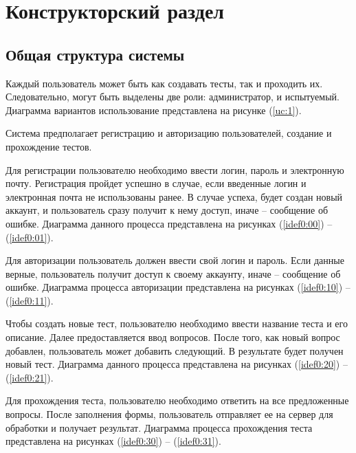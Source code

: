 \chapter{Конструкторский раздел}

\section{Общая структура системы}
Каждый пользователь может быть как создавать тесты, так и проходить их. Следовательно, могут быть выделены две роли: администратор, и испытуемый. Диаграмма вариантов использование представлена на рисунке (\ref{uc:1}).

Система предполагает регистрацию и авторизацию пользователей, создание и прохождение тестов. 
	
Для регистрации пользователю необходимо ввести логин, пароль и электронную почту. Регистрация пройдет успешно в случае, если введенные логин и электронная почта не использованы ранее. В случае успеха, будет создан новый аккаунт, и пользователь сразу получит к нему доступ, иначе -- сообщение об ошибке. Диаграмма данного процесса представлена на рисунках (\ref{idef0:00}) -- (\ref{idef0:01}).

Для авторизации пользователь должен ввести свой логин и пароль. Если данные верные, пользователь получит доступ к своему аккаунту, иначе -- сообщение об ошибке. Диаграмма процесса авторизации представлена на рисунках (\ref{idef0:10}) -- (\ref{idef0:11}).

Чтобы создать новые тест, пользователю необходимо ввести название теста и его описание. Далее предоставляется ввод вопросов. После того, как новый вопрос добавлен, пользователь может добавить следующий. В результате будет получен новый тест. Диаграмма данного процесса представлена на рисунках  (\ref{idef0:20}) -- (\ref{idef0:21}).

Для прохождения теста, пользователю необходимо ответить на все предложенные вопросы. После заполнения формы, пользователь отправляет ее на сервер для обработки и получает результат. Диаграмма процесса прохождения теста представлена на рисунках  (\ref{idef0:30}) -- (\ref{idef0:31}).


\begin{figure}[ht!]
\end{figure}

